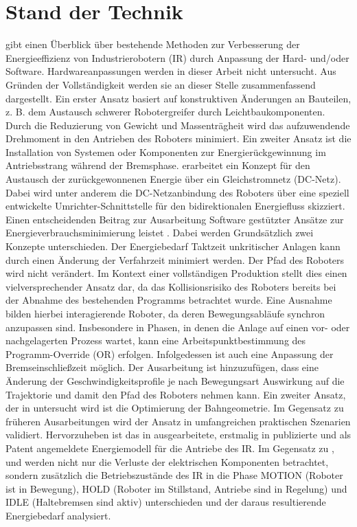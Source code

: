 \chapter{Stand der Technik}
\cite{Carabin.2017} gibt einen Überblick über bestehende Methoden zur Verbesserung der Energieeffizienz von Industrierobotern (IR) durch Anpassung der Hard- und/oder Software. Hardwareanpassungen werden in dieser Arbeit nicht untersucht. Aus Gründen der Vollständigkeit werden sie an dieser Stelle zusammenfassend dargestellt. Ein erster Ansatz basiert auf konstruktiven Änderungen an Bauteilen, z. B. dem Austausch schwerer Robotergreifer durch Leichtbaukomponenten. Durch die Reduzierung von Gewicht und Massenträgheit wird das aufzuwendende Drehmoment in den Antrieben des Roboters minimiert. Ein zweiter Ansatz ist die Installation von Systemen oder Komponenten zur Energierückgewinnung im Antriebsstrang während der Bremsphase. \cite{Pellicciari.2015} erarbeitet ein Konzept für den Austausch der zurückgewonnenen Energie über ein Gleichstromnetz (DC-Netz). Dabei wird unter anderem die DC-Netzanbindung des Roboters über eine speziell entwickelte Umrichter-Schnittstelle für den bidirektionalen Energiefluss skizziert.
%
Einen entscheidenden Beitrag zur Ausarbeitung Software gestützter Ansätze zur Energieverbrauchsminimierung leistet \cite{Eggers.2019}. Dabei werden Grundsätzlich zwei Konzepte unterschieden. Der Energiebedarf Taktzeit unkritischer Anlagen kann durch einen  Änderung der Verfahrzeit  minimiert werden. Der Pfad des Roboters wird nicht verändert. Im Kontext einer vollständigen Produktion stellt dies einen vielversprechender Ansatz dar, da das Kollisionsrisiko des Roboters bereits bei der Abnahme des bestehenden Programms betrachtet wurde. Eine Ausnahme bilden hierbei interagierende Roboter, da deren Bewegungsabläufe synchron anzupassen sind. Insbesondere in Phasen, in denen die Anlage auf einen vor- oder nachgelagerten Prozess wartet, kann eine Arbeitspunktbestimmung des Programm-Override (OR) erfolgen. Infolgedessen ist auch eine Anpassung der Bremseinschließzeit möglich. Der Ausarbeitung \cite{Eggers.2019} ist hinzuzufügen, dass eine Änderung der Geschwindigkeitsprofile je nach Bewegungsart Auswirkung auf die Trajektorie und damit den Pfad des Roboters nehmen kann. Ein zweiter Ansatz, der in \cite{Eggers.2019} untersucht wird ist die Optimierung der Bahngeometrie. Im Gegensatz zu früheren Ausarbeitungen wird der Ansatz in umfangreichen praktischen Szenarien validiert. 
%
%
Hervorzuheben ist das in \cite{Eggers.2019} ausgearbeitete, erstmalig in \cite{Ziaukas.2017} publizierte und als Patent angemeldete Energiemodell \cite{Patent.2016} für die Antriebe des IR. Im Gegensatz zu \cite{Pellicciari.2011}, \cite{Sergaki.2002} und \cite{Paryanto.2015} werden nicht nur die Verluste der elektrischen Komponenten betrachtet, sondern zusätzlich die Betriebszustände des IR in die Phase MOTION (Roboter ist in Bewegung), HOLD (Roboter im Stillstand, Antriebe sind in Regelung) und IDLE (Haltebremsen sind aktiv) unterschieden und der daraus resultierende Energiebedarf analysiert\cite{Ziaukas.2017}. 
